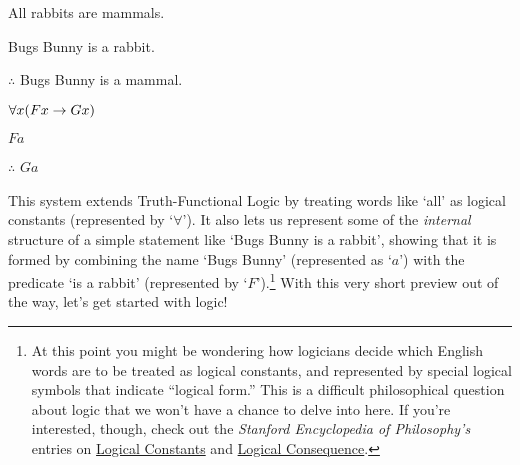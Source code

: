 \begin{multicols}{2}

\begin{earg}
\item[\eref{exarg1}]All rabbits are mammals.
\item[] Bugs Bunny is a rabbit.
\item[] $\therefore$ Bugs Bunny is a mammal.
\end{earg}

\columnbreak

	\begin{earg}
		\item[] $\forall x(Fx \rightarrow Gx)$
		\item[] $Fa$
		\item[] $\therefore$ $Ga$
	\end{earg}

\end{multicols}

\noindent This system extends Truth-Functional Logic by treating words like `all' as logical constants (represented by `$\forall$').  It also lets us represent some of the \emph{internal} structure of a simple statement like `Bugs Bunny is a rabbit', showing that it is formed by combining the name `Bugs Bunny' (represented as `$a$') with the predicate `is a rabbit' (represented by `$F$').\footnote{At this point you might be wondering how logicians decide which English words are to be treated as logical constants, and represented by special logical symbols that indicate ``logical form.''  This is a difficult philosophical question about logic that we won't have a chance to delve into here.  If you're interested, though, check out the \emph{Stanford Encyclopedia of Philosophy's} entries on \href{http://plato.stanford.edu/entries/logical-constants/}{Logical Constants} and  \href{http://plato.stanford.edu/entries/logical-consequence/}{Logical Consequence}.} With this very short preview out of the way, let's get started with logic! 




